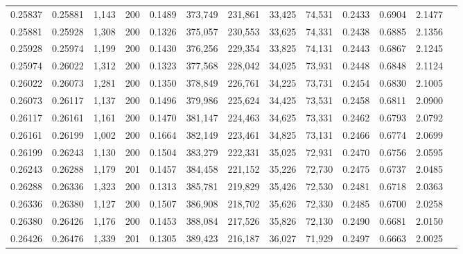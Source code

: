 \begin{tabular}{rrrrrrrrrrrrr}
0.25837 & 0.25881 & 1,143 & 200 &                                     0.1489 & 373,749 & 231,861 &  33,425 &  74,531 & 0.2433 & 0.6904 & 2.1477 \\
0.25881 & 0.25928 & 1,308 & 200 &                                     0.1326 & 375,057 & 230,553 &  33,625 &  74,331 & 0.2438 & 0.6885 & 2.1356 \\
0.25928 & 0.25974 & 1,199 & 200 &                                     0.1430 & 376,256 & 229,354 &  33,825 &  74,131 & 0.2443 & 0.6867 & 2.1245 \\
0.25974 & 0.26022 & 1,312 & 200 &                                     0.1323 & 377,568 & 228,042 &  34,025 &  73,931 & 0.2448 & 0.6848 & 2.1124 \\
0.26022 & 0.26073 & 1,281 & 200 &                                     0.1350 & 378,849 & 226,761 &  34,225 &  73,731 & 0.2454 & 0.6830 & 2.1005 \\
0.26073 & 0.26117 & 1,137 & 200 &                                     0.1496 & 379,986 & 225,624 &  34,425 &  73,531 & 0.2458 & 0.6811 & 2.0900 \\
0.26117 & 0.26161 & 1,161 & 200 &                                     0.1470 & 381,147 & 224,463 &  34,625 &  73,331 & 0.2462 & 0.6793 & 2.0792 \\
0.26161 & 0.26199 & 1,002 & 200 &                                     0.1664 & 382,149 & 223,461 &  34,825 &  73,131 & 0.2466 & 0.6774 & 2.0699 \\
0.26199 & 0.26243 & 1,130 & 200 &                                     0.1504 & 383,279 & 222,331 &  35,025 &  72,931 & 0.2470 & 0.6756 & 2.0595 \\
0.26243 & 0.26288 & 1,179 & 201 &                                     0.1457 & 384,458 & 221,152 &  35,226 &  72,730 & 0.2475 & 0.6737 & 2.0485 \\
0.26288 & 0.26336 & 1,323 & 200 &                                     0.1313 & 385,781 & 219,829 &  35,426 &  72,530 & 0.2481 & 0.6718 & 2.0363 \\
0.26336 & 0.26380 & 1,127 & 200 &                                     0.1507 & 386,908 & 218,702 &  35,626 &  72,330 & 0.2485 & 0.6700 & 2.0258 \\
0.26380 & 0.26426 & 1,176 & 200 &                                     0.1453 & 388,084 & 217,526 &  35,826 &  72,130 & 0.2490 & 0.6681 & 2.0150 \\
0.26426 & 0.26476 & 1,339 & 201 &                                     0.1305 & 389,423 & 216,187 &  36,027 &  71,929 & 0.2497 & 0.6663 & 2.0025 \\

\end{tabular}
